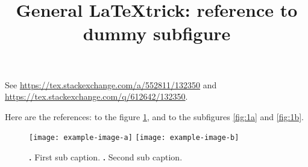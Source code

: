 \documentclass{goose-article}
\title{General \LaTeX trick: reference to dummy subfigure}
\author{}
\begin{document}
\maketitle

See \url{https://tex.stackexchange.com/a/552811/132350} and
\url{https://tex.stackexchange.com/q/612642/132350}.

Here are the references:
to the figure \cref{fig:1}, and to the subfigures \cref{fig:1a} and \cref{fig:1b}.

\begin{figure}[htp]
    \centering
    \subfloat{\label{fig:1a}}
    \subfloat{\label{fig:1b}}
    \texttt{[image: example-image-a]}
    \hspace{.02\linewidth}
    \texttt{[image: example-image-b]}
    \caption{
        \textbf{\protect{}.}
        First sub caption.
        \textbf{\protect{}.}
        Second sub caption.
        \kant[8]
    }
    \label{fig:1}
\end{figure}

\kant[1-7]
\end{document}
